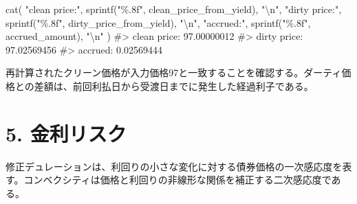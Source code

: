 \documentclass[
  letterpaper,
  DIV=11,
  numbers=noendperiod]{scrreprt}
\newenvironment{Shaded}{\begin{snugshade}}{\end{snugshade}}
\newcommand{\CommentTok}[1]{\textcolor[rgb]{0.37,0.37,0.37}{#1}}
\newcommand{\FunctionTok}[1]{\textcolor[rgb]{0.28,0.35,0.67}{#1}}
\newcommand{\NormalTok}[1]{\textcolor[rgb]{0.00,0.23,0.31}{#1}}
\newcommand{\SpecialCharTok}[1]{\textcolor[rgb]{0.37,0.37,0.37}{#1}}
\newcommand{\StringTok}[1]{\textcolor[rgb]{0.13,0.47,0.30}{#1}}
\begin{document}
\begin{Shaded}
\begin{Highlighting}[]
\FunctionTok{cat}\NormalTok{(}
  \StringTok{"clean price:"}\NormalTok{,}
  \FunctionTok{sprintf}\NormalTok{(}\StringTok{"\%.8f"}\NormalTok{, clean\_price\_from\_yield),}
  \StringTok{"}\SpecialCharTok{\textbackslash{}n}\StringTok{"}\NormalTok{,}
  \StringTok{"dirty price:"}\NormalTok{,}
  \FunctionTok{sprintf}\NormalTok{(}\StringTok{"\%.8f"}\NormalTok{, dirty\_price\_from\_yield),}
  \StringTok{"}\SpecialCharTok{\textbackslash{}n}\StringTok{"}\NormalTok{,}
  \StringTok{"accrued:"}\NormalTok{,}
  \FunctionTok{sprintf}\NormalTok{(}\StringTok{"\%.8f"}\NormalTok{, accrued\_amount),}
  \StringTok{"}\SpecialCharTok{\textbackslash{}n}\StringTok{"}
\NormalTok{)}
\CommentTok{\#\textgreater{} clean price: 97.00000012 }
\CommentTok{\#\textgreater{}  dirty price: 97.02569456 }
\CommentTok{\#\textgreater{}  accrued: 0.02569444}
\end{Highlighting}
\end{Shaded}

再計算されたクリーン価格が入力価格97と一致することを確認する。ダーティ価格との差額は、前回利払日から受渡日までに発生した経過利子である。

\section{5. 金利リスク}\label{ux91d1ux5229ux30eaux30b9ux30af}

修正デュレーションは、利回りの小さな変化に対する債券価格の一次感応度を表す。コンベクシティは価格と利回りの非線形な関係を補正する二次感応度である。
\end{document}
